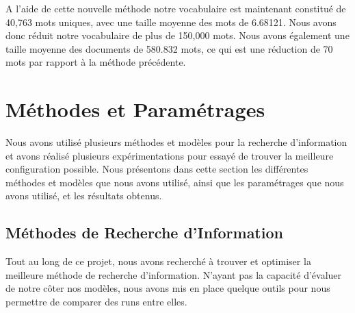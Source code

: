 \documentclass[a4paper, 12pt]{article}
\begin{document}
\begin{table}[!h]
  \begin{minipage}{0.35\linewidth}
      \centering
      \caption{Statistiques de la collection}
  \end{minipage}%
  \hspace{0.05\linewidth} %
  \begin{minipage}{0.60\linewidth}
    A l'aide de cette nouvelle méthode notre vocabulaire est maintenant constitué de 40,763 mots uniques,
    avec une taille moyenne des mots de 6.68121. Nous avons donc réduit notre vocabulaire de plus de 150,000 mots.
    Nous avons également une taille moyenne des documents de 580.832 mots, ce qui est une réduction de 70 mots par rapport à la méthode précédente.
  \end{minipage}
\end{table}

\section{Méthodes et Paramétrages}

Nous avons utilisé plusieurs méthodes et modèles pour la recherche d'information et avons 
réalisé plusieurs expérimentations pour essayé de trouver la meilleure configuration possible. Nous présentons
dans cette section les différentes méthodes et modèles que nous avons utilisé, ainsi que les paramétrages que nous avons utilisé, 
et les résultats obtenus.

\subsection{Méthodes de Recherche d'Information}

Tout au long de ce projet, nous avons recherché à trouver et optimiser la meilleure méthode de recherche d'information. N'ayant pas la capacité d'évaluer de 
notre côter nos modèles, nous avons mis en place quelque outils pour nous permettre de comparer des runs entre elles.
\end{document}
